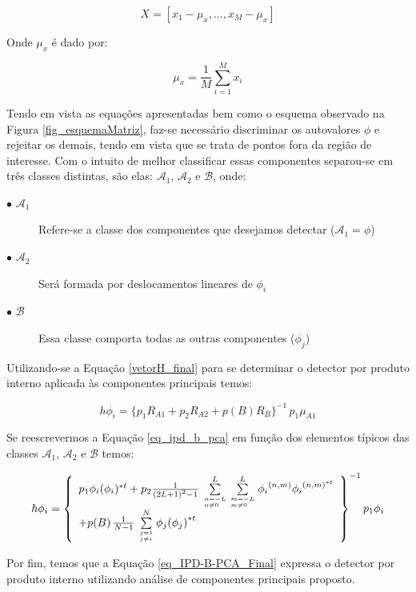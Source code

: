 \begin{equation}\label{eq_MatrizX}
X = [{x_1} - {\mu _x},...,{x_M} - {\mu _x}]
\end{equation}

Onde $\mu_x$ é dado por:

\begin{equation}\label{eq_mi}
{\mu _x} = \frac{1}{M}\sum\limits_{i = 1}^M {{x_i}}
\end{equation}

Tendo em vista as equações apresentadas bem como o esquema observado na Figura \ref{fig_esquemaMatriz}, faz-se necessário discriminar os autovalores $\phi$ e rejeitar os demais, tendo em vista que se trata de pontos fora da região de interesse. Com o intuito de melhor classificar essas componentes separou-se em três classes distintas, são elas: $\mathcal{A}_1$, $\mathcal{A}_2$ e $\mathcal{B}$, onde:

\begin{description}
  \item[$\bullet$ $\mathcal{A}_1$] Refere-se a classe dos componentes que desejamos detectar ($\mathcal{A}_1=\phi$)
  \item[$\bullet$ $\mathcal{A}_2$] Será formada por deslocamentos lineares de $\phi_i$
  \item[$\bullet$ $\mathcal{B}$] Essa classe comporta todas as outras componentes ($\phi_j$)
\end{description}

Utilizando-se a Equação \eqref{vetorH_final} para se determinar o detector por produto interno aplicada às componentes principais temos:

\begin{equation}\label{eq_ipd_b_pca}
h{\phi _i} = {\{ {p_1}{R_{A1}} + {p_2}{R_{A2}} + p(B){R_B}\} ^{ - 1}}\,{p_1}{\mu _{A1}}
\end{equation}

Se reescrevermos a Equação \eqref{eq_ipd_b_pca} em função dos elementos típicos das classes $\mathcal{A}_1$, $\mathcal{A}_2$ e $\mathcal{B}$ temos:

\begin{equation} \label{eq_IPD-B-PCA_Final}
h{\phi _i} = {\left\{ \begin{array}{l}
{p_1}{\phi _i}{({\phi _i})^{*t}} + {p_2}\frac{1}{{{{(2L + 1)}^2} - 1}}\,\sum\limits_{n =  - L\hfill\atop
n \ne 0\hfill}^L {\sum\limits_{m =  - L\hfill\atop
m \ne 0\hfill}^L {{\phi _i}^{(n,m)}{\phi _i}^{{{(n,m)}^{*t}}}} } \\
 + p(B)\,\frac{1}{{N - 1}}\,\sum\limits_{j = 1\hfill\atop
j \ne i\hfill}^N {{\phi _j}{{({\phi _j})}^{*t}}} 
\end{array} \right\}^{ - 1}}\,{p_1}{\phi _i}
\end{equation}

Por fim, temos que a Equação \eqref{eq_IPD-B-PCA_Final} expressa o detector por produto interno utilizando análise de componentes principais proposto.

